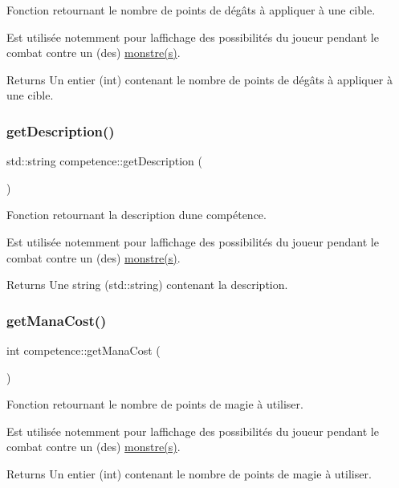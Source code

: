 Fonction retournant le nombre de points de dégâts à appliquer à une cible. 

Est utilisée notemment pour l\textquotesingle{}affichage des possibilités du joueur pendant le combat contre un (des) \hyperlink{classmonstre}{monstre(s)}. \begin{DoxyReturn}{Returns}
Un entier ({\ttfamily int}) contenant le nombre de points de dégâts à appliquer à une cible. 
\end{DoxyReturn}
\mbox{\label{classcompetence_ae0980a623fb74c32a630400cdb56cd14}} 
\subsubsection{\texorpdfstring{get\+Description()}{getDescription()}}
{\footnotesize\ttfamily std\+::string competence\+::get\+Description (\begin{DoxyParamCaption}{ }\end{DoxyParamCaption})}



Fonction retournant la description d\textquotesingle{}une compétence. 

Est utilisée notemment pour l\textquotesingle{}affichage des possibilités du joueur pendant le combat contre un (des) \hyperlink{classmonstre}{monstre(s)}. \begin{DoxyReturn}{Returns}
Une string ({\ttfamily std\+::string}) contenant la description. 
\end{DoxyReturn}
\mbox{\label{classcompetence_a8346c6ae95df148e42f26b9a94655c8f}} 
\subsubsection{\texorpdfstring{get\+Mana\+Cost()}{getManaCost()}}
{\footnotesize\ttfamily int competence\+::get\+Mana\+Cost (\begin{DoxyParamCaption}{ }\end{DoxyParamCaption})}



Fonction retournant le nombre de points de magie à utiliser. 

Est utilisée notemment pour l\textquotesingle{}affichage des possibilités du joueur pendant le combat contre un (des) \hyperlink{classmonstre}{monstre(s)}. \begin{DoxyReturn}{Returns}
Un entier ({\ttfamily int}) contenant le nombre de points de magie à utiliser. 
\end{DoxyReturn}
\mbox{\label{classcompetence_abbb996751e239fc151caae2a73947710}} 
